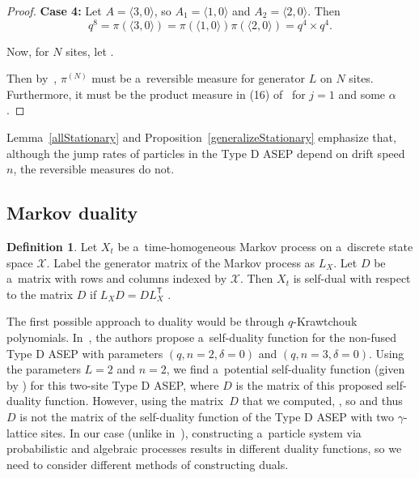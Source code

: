 \documentclass[pdftex]{sigma}
\numberwithin{equation}{section}
\theoremstyle{definition}
\newtheorem{Definition}[Theorem]{Definition}
\begin{document}
\begin{proof}
\textbf{Case 4:} Let $A = \langle 3,0\rangle$, so $A_1 = \langle 1,0\rangle$ and $A_2 = \langle 2,0 \rangle$. Then
\[q^8 = \pi(\langle 3,0\rangle) = \pi(\langle 1,0\rangle) \pi(\langle 2,0 \rangle) = q^4 \times q^4.\]

Now, for $N$ sites, let .

Then by~\cite[Theorem 2.1]{kuan2024qexchangeablemeasurestransformationsinteracting}, $\pi^{(N)}$ must be a~reversible measure for generator $L$ on $N$ sites. Furthermore, it must be the product measure in (16) of~\cite{Carinci2014} for $j = 1$ and some $\alpha$.
\end{proof}

Lemma~\ref{allStationary} and Proposition~\ref{generalizeStationary} emphasize that, although the jump rates of particles in the Type D ASEP depend on drift speed $n$, the reversible measures do not.

\subsection{Markov duality}\label{subsection--MarkovDuality}

\begin{Definition}
Let $X_t$ be a~time-homogeneous Markov process on a~discrete state space $\mathcal{X}$. Label the generator matrix of the Markov process as $L_X$. Let $D$ be a~matrix with rows and columns indexed by $\mathcal{X}$. Then $X_t$ is self-dual with respect to the matrix $D$ if $L_X D = D L_X^{\mathsf{T}}$
\cite{10.1214/aop/1176990628}.
\end{Definition}

The first possible approach to duality would be through $q$-Krawtchouk polynomials. In~\cite[Theorem 3.1]{Blyschak_2023}, the authors propose a~self-duality function for the non-fused Type D ASEP with parameters $(q, n = 2, \delta = 0)$ and $(q, n = 3, \delta = 0)$. Using the parameters $L = 2$ and $n = 2$, we find a~potential self-duality function (given by \cite[Theorem~3.1]{Blyschak_2023}) for this two-site Type D ASEP, where $D$ is the matrix of this proposed self-duality function. However, using the matrix~$D$ that we computed, , so  and thus $D$ is not the matrix of the self-duality function of the Type D ASEP with two $\gamma$-lattice sites. In our case (unlike in~\cite{Blyschak_2023}),
constructing a~particle system via probabilistic and algebraic processes results in different duality functions, so we need to consider different methods of constructing duals.
\end{document}
